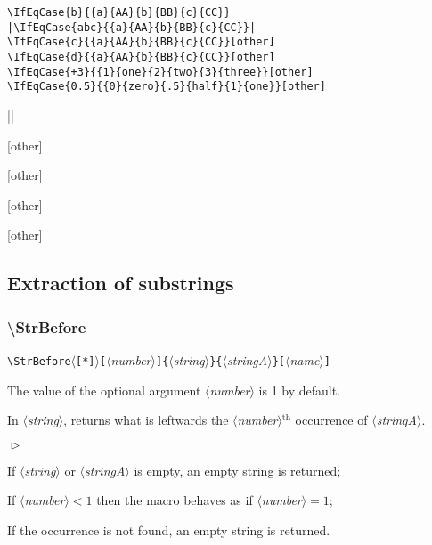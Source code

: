 \documentclass[a4paper,10pt]{article}
\newcommand\argu[1]{$\langle$\textit{#1}$\rangle$}
\newcommand\ARGU[1]{\texttt{\{}\argu{#1}\texttt{\}}}
\newcommand\arguC[1]{\texttt{[}\argu{#1}\texttt{]}}
\newcommand\etoile{$\langle$\texttt{[*]}$\rangle$}
\newenvironment{Conditions}[1][1cm]%
{\begin{list}%
	{$\vartriangleright$}%
	{\setlength{\leftmargin}{#1}
	 \setlength{\itemsep}{0pt}
	 \setlength{\parsep}{0pt}
	 \setlength{\topsep}{2ptplus3ptminus2pt}
	}}%
{\end{list}}
\renewcommand\th{${}^\text{th}$\xspace}
\newcommand\styleexemple{\small\vskip4pt}
\newcommand\verbinline{\lstinline[basicstyle=\normalsize\ttfamily]}
\begin{document}
\begin{minipage}[t]{0.65\linewidth}
\begin{lstlisting}
\IfEqCase{b}{{a}{AA}{b}{BB}{c}{CC}}
|\IfEqCase{abc}{{a}{AA}{b}{BB}{c}{CC}}|
\IfEqCase{c}{{a}{AA}{b}{BB}{c}{CC}}[other]
\IfEqCase{d}{{a}{AA}{b}{BB}{c}{CC}}[other]
\IfEqCase{+3}{{1}{one}{2}{two}{3}{three}}[other]
\IfEqCase{0.5}{{0}{zero}{.5}{half}{1}{one}}[other]
\end{lstlisting}%
\end{minipage}\hfill
\begin{minipage}[t]{0.35\linewidth}
	\styleexemple
	\par
	||\par
	[other]\par
	[other]\par
	[other]\par
	[other]
\end{minipage}%

\subsection{Extraction of substrings}
\subsubsection{\ttfamily\textbackslash StrBefore}

\verbinline|\StrBefore|\etoile\arguC{number}\ARGU{string}\ARGU{stringA}\arguC{name}
\smallskip

The value of the optional argument \argu{number} is 1 by default.\par\smallskip

In \argu{string}, returns what is leftwards the \argu{number}\th occurrence of \argu{stringA}.\medskip

\begin{Conditions}
\item If \argu{string} or \argu{stringA} is empty, an empty string is returned;
\item If \argu{number}${}<1$ then the macro behaves as if \argu{number}${}=1$;
\item If the occurrence is not found, an empty string is returned.
\end{Conditions}
\end{document}
